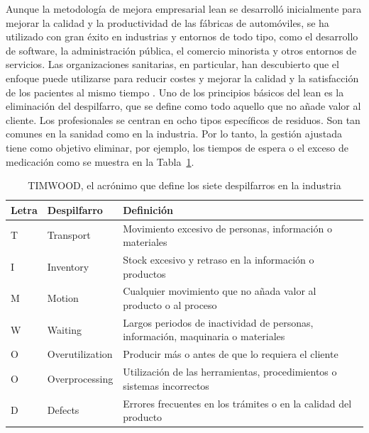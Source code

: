 Aunque la metodología de mejora empresarial lean se desarrolló inicialmente para mejorar la calidad y la productividad de las fábricas de automóviles, se ha utilizado con gran éxito en industrias y entornos de todo tipo, como el desarrollo de software, la administración pública, el comercio minorista y otros entornos de servicios.
Las organizaciones sanitarias, en particular, han descubierto que el enfoque puede utilizarse para reducir costes y mejorar la calidad y la satisfacción de los pacientes al mismo tiempo \cite{millard_how_nodate}.
Uno de los principios básicos del lean es la eliminación del despilfarro, que se define como todo aquello que no añade valor al cliente.
Los profesionales se centran en ocho tipos específicos de residuos.
Son tan comunes en la sanidad como en la industria.
Por lo tanto, la gestión ajustada tiene como objetivo eliminar, por ejemplo, los tiempos de espera o el exceso de medicación como se muestra en la Tabla~\ref{tab:timwood}.

\begin{table}
    \centering
    \begin{tabular}{llp{10cm}}
        \toprule
        Letra & Despilfarro     & Definición                                                                         \\
        \midrule
        T     & Transport       & Movimiento excesivo de personas, información o materiales                          \\
        I     & Inventory       & Stock excesivo y retraso en la información o productos                             \\
        M     & Motion          & Cualquier movimiento que no añada valor al producto o al proceso                   \\
        W     & Waiting         & Largos periodos de inactividad de personas, información, maquinaria o   materiales \\
        O     & Overutilization & Producir más o antes de que lo requiera el cliente                                 \\
        O     & Overprocessing  & Utilización de las herramientas, procedimientos o sistemas incorrectos             \\
        D     & Defects         & Errores frecuentes en los trámites o en la calidad del producto                    \\
        \bottomrule
    \end{tabular}
    \caption{TIMWOOD, el acrónimo que define los siete despilfarros en la industria}
    \label{tab:timwood}
\end{table}

